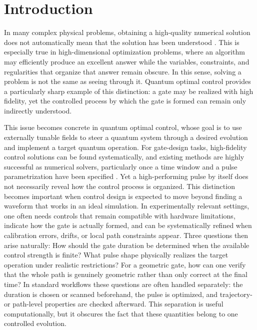 \documentclass[aps,prx,reprint,superscriptaddress,nofootinbib,longbibliography,floatfix,showkeys]{revtex4-2}
\begin{document}
\section{Introduction}

In many complex physical problems, obtaining a high-quality numerical
solution does not automatically mean that the solution has been understood
\cite{Schmidt2009NaturalLaws,Brunton2016SINDy,Iten2020PhysicalConcepts,Cranmer2020SymbolicModels}.
This is especially true in high-dimensional optimization problems, where an
algorithm may efficiently produce an excellent answer while the variables,
constraints, and regularities that organize that answer remain obscure.  In
this sense, solving a problem is not the same as seeing through it.  Quantum
optimal control provides a particularly sharp example of this distinction: a
gate may be realized with high fidelity, yet the controlled process by which
the gate is formed can remain only indirectly understood.

This issue becomes concrete in quantum optimal control, whose goal is to use
externally tunable fields to steer a
quantum system through a desired evolution and implement a target quantum
operation.  For gate-design tasks, high-fidelity control solutions can be
found systematically, and existing methods are highly successful as
numerical solvers, particularly once a time window and a pulse
parametrization have been specified
\cite{Brif2010QuantumControlReview,Glaser2015TrainingCat,Koch2022QuantumTechnologies,Khaneja2005GRAPE,Palao2003KrotovUnitary}.
Yet a high-performing pulse by itself does not necessarily reveal how the
control process is organized.  This distinction becomes important when
control design is expected to move beyond finding a waveform that works in
an ideal simulation.  In experimentally relevant settings, one often needs
controls that remain compatible with hardware limitations, indicate how the
gate is actually formed, and can be systematically refined when calibration
errors, drifts, or local path constraints appear.  Three questions then
arise naturally: How should the gate duration be determined when the
available control strength is finite? What pulse shape physically realizes
the target operation under realistic restrictions? For a geometric gate, how
can one verify that the whole path is genuinely geometric rather than only
correct at the final time? In standard workflows these questions are often
handled separately: the duration is chosen or scanned beforehand, the pulse
is optimized, and trajectory- or path-level properties are checked
afterward.  This separation is useful computationally, but it obscures the
fact that these quantities belong to one controlled evolution.
\end{document}
